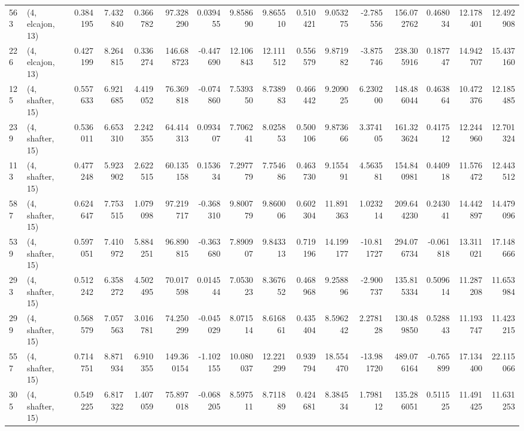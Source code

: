 \begin{tabular}{llrrrrrrrrrrrrrr}
563 &  (4, elcajon, 13) &   0.384195 &   7.432840 &   0.366782 &    97.328290 &   0.039455 &   9.858690 &   9.865510 &  0.510421 &   9.053275 &  -2.785556 &   156.072762 &  0.468034 &  12.178401 &  12.492908 \\
226 &  (4, elcajon, 13) &   0.427199 &   8.264815 &   0.336274 &   146.688723 &  -0.447690 &  12.106843 &  12.111512 &  0.556579 &   9.871982 &  -3.875746 &   238.305916 &  0.187747 &  14.942707 &  15.437160 \\
125 &  (4, shafter, 15) &   0.557633 &   6.921685 &   4.419052 &    76.369818 &  -0.074860 &   7.539350 &   8.738983 &  0.466442 &   9.209025 &   6.230200 &   148.486044 &  0.463864 &  10.472376 &  12.185485 \\
239 &  (4, shafter, 15) &   0.536011 &   6.653310 &   2.242355 &    64.414313 &   0.093407 &   7.706241 &   8.025853 &  0.500106 &   9.873666 &   3.374105 &   161.323624 &  0.417512 &  12.244960 &  12.701324 \\
113 &  (4, shafter, 15) &   0.477248 &   5.923902 &   2.622515 &    60.135158 &   0.153634 &   7.297779 &   7.754686 &  0.463730 &   9.155491 &   4.563581 &   154.840981 &  0.440918 &  11.576472 &  12.443512 \\
587 &  (4, shafter, 15) &   0.624647 &   7.753515 &   1.079098 &    97.219717 &  -0.368310 &   9.800779 &   9.860006 &  0.602304 &  11.891363 &   1.023214 &   209.644230 &  0.243041 &  14.442897 &  14.479096 \\
539 &  (4, shafter, 15) &   0.597051 &   7.410972 &   5.884251 &    96.890815 &  -0.363680 &   7.890907 &   9.843313 &  0.719196 &  14.199177 & -10.811727 &   294.076734 & -0.061818 &  13.311021 &  17.148666 \\
293 &  (4, shafter, 15) &   0.512242 &   6.358272 &   4.502495 &    70.017598 &   0.014544 &   7.053023 &   8.367652 &  0.468968 &   9.258896 &  -2.900737 &   135.815334 &  0.509614 &  11.287208 &  11.653984 \\
299 &  (4, shafter, 15) &   0.568579 &   7.057563 &   3.016781 &    74.250299 &  -0.045029 &   8.071514 &   8.616861 &  0.435404 &   8.596242 &   2.278128 &   130.489850 &  0.528843 &  11.193747 &  11.423215 \\
557 &  (4, shafter, 15) &   0.714751 &   8.871934 &   6.910355 &   149.360154 &  -1.102155 &  10.080037 &  12.221299 &  0.939794 &  18.554470 & -13.981720 &   489.076164 & -0.765899 &  17.134400 &  22.115066 \\
305 &  (4, shafter, 15) &   0.549225 &   6.817322 &   1.407059 &    75.897018 &  -0.068205 &   8.597511 &   8.711889 &  0.424681 &   8.384534 &   1.798112 &   135.286051 &  0.511525 &  11.491425 &  11.631253 \\

\end{tabular}

